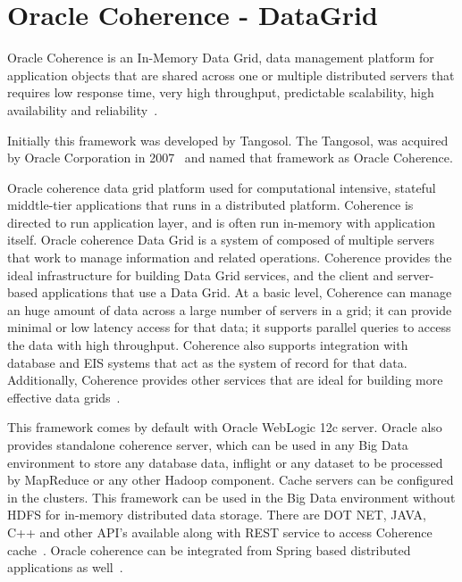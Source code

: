 \section{Oracle Coherence - DataGrid}

Oracle Coherence is an In-Memory Data Grid, 
data management platform for application objects 
that are shared across one or multiple distributed
servers that requires low response time, 
very high throughput, predictable
scalability, high availability 
and reliability~\cite{hid-sp18-514-OracleCoherence}. 

Initially this framework was developed by Tangosol.
The Tangosol, was acquired by Oracle Corporation 
in 2007~\cite{hid-sp18-514-coherencewiki} and
named that framework as Oracle Coherence.

Oracle coherence data grid platform
used for computational intensive, 
stateful middtle-tier applications that runs 
in a distributed platform. 
Coherence is directed to run application layer, 
and is often run in-memory with application itself. 
Oracle coherence Data Grid is a system 
of composed of multiple servers 
that work to manage information and 
related operations. Coherence provides the 
ideal infrastructure for building Data Grid
services, and the client and server-based 
applications that use a Data Grid. 
At a basic level, Coherence can manage an 
huge amount of data across a large 
number of servers in a grid; 
it can provide minimal or low 
latency access for that data; 
it supports parallel queries to access
the data with high throughput.
Coherence also supports integration 
with database and EIS systems that act 
as the system of record for that data. 
Additionally, Coherence provides other services 
that are ideal for building more effective 
data grids~\cite{hid-sp18-514-OracleCoherence}. 

This framework comes by default with Oracle 
WebLogic 12c server. Oracle also provides standalone 
coherence server, which can be used in any Big Data environment 
to store any database data, inflight or any dataset to 
be processed by MapReduce or any other Hadoop component.
Cache servers can be configured in the clusters. 
This framework can be used in the Big Data environment 
without HDFS for in-memory distributed data storage. 
There are DOT NET, JAVA, C++ and other API's available 
along with REST service to access Coherence 
cache~\cite{hid-sp18-514-OracleCoherence}. 
Oracle coherence can be integrated from Spring 
based distributed applications as 
well~\cite{hid-sp18-514-CoherenceSpringInt}.